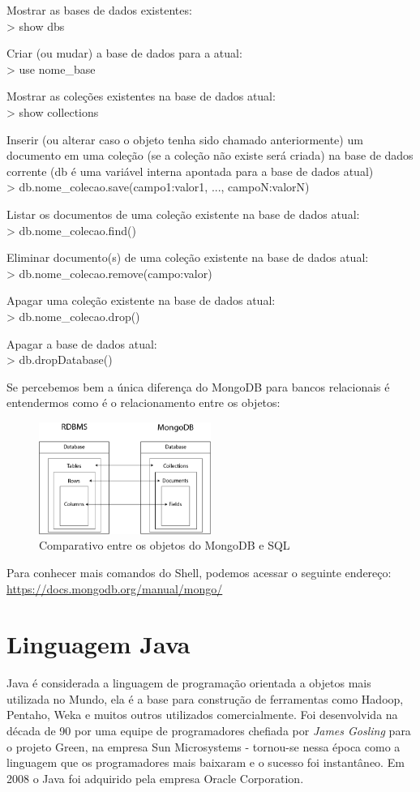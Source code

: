 \documentclass[a4paper,11pt]{article}
\begin{document}
Mostrar as bases de dados existentes: \\
{\ttfamily> show dbs}

Criar (ou mudar) a base de dados para a atual: \\
{\ttfamily> use nome\_base}

Mostrar as coleções existentes na base de dados atual: \\
{\ttfamily> show collections}

Inserir (ou alterar caso o objeto tenha sido chamado anteriormente) um documento em uma coleção (se a coleção não existe será criada) na base de dados corrente (db é uma variável interna apontada para a base de dados atual) \\
{\ttfamily> db.nome\_colecao.save({campo1:valor1, ..., campoN:valorN})} 

Listar os documentos de uma coleção existente na base de dados atual: \\
{\ttfamily> db.nome\_colecao.find()}

Eliminar documento(s) de uma coleção existente na base de dados atual: \\
{\ttfamily> db.nome\_colecao.remove({campo:valor})}

Apagar uma coleção existente na base de dados atual: \\
{\ttfamily> db.nome\_colecao.drop()}

Apagar a base de dados atual: \\
{\ttfamily> db.dropDatabase()}

Se percebemos bem a única diferença do MongoDB para bancos relacionais é entendermos como é o relacionamento entre os objetos:
\begin{figure}[H]
	\centering
	\includegraphics[width=0.5\textwidth]{imagens/comparativo.png}
	\caption{Comparativo entre os objetos do MongoDB e SQL}
\end{figure}

Para conhecer mais comandos do Shell, podemos acessar o seguinte endereço:  \url{https://docs.mongodb.org/manual/mongo/}

\section{Linguagem Java}
Java é considerada a linguagem de programação orientada a objetos mais utilizada no Mundo, ela é a base para construção de ferramentas como Hadoop, Pentaho, Weka e muitos outros utilizados comercialmente. Foi desenvolvida na década de 90 por uma equipe de programadores chefiada por \textit{James Gosling} para o projeto Green, na empresa Sun Microsystems - tornou-se nessa época como a linguagem que os programadores mais baixaram e o sucesso foi instantâneo. Em 2008 o Java foi adquirido pela empresa Oracle Corporation.
\end{document}
